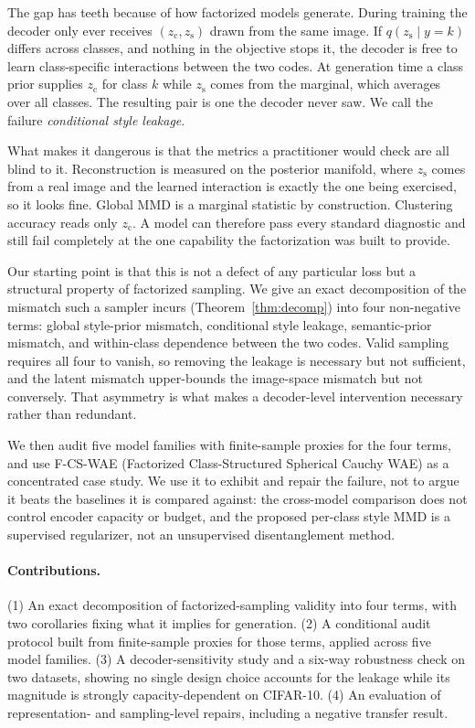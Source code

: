 \documentclass[letterpaper]{article} %
\newcommand{\ours}{F-CS-WAE}
\newcommand{\zc}{z_{\mathrm{c}}}
\newcommand{\zs}{z_{\mathrm{s}}}
\begin{document}
The gap has teeth because of how factorized models generate. During
training the decoder only ever receives $(\zc,\zs)$ drawn from the same
image. If $q(\zs\mid y{=}k)$ differs across classes, and nothing in the
objective stops it, the decoder is free to learn class-specific interactions
between the two codes. At generation time a class prior supplies $\zc$ for
class $k$ while $\zs$ comes from the marginal, which averages over all
classes. The resulting pair is one the decoder never saw. We call the
failure \emph{conditional style leakage}.

What makes it dangerous is that the metrics a practitioner would check are
all blind to it. Reconstruction is measured on the posterior manifold, where
$\zs$ comes from a real image and the learned interaction is exactly the one
being exercised, so it looks fine. Global MMD is a marginal statistic by
construction. Clustering accuracy reads only $\zc$. A model can therefore
pass every standard diagnostic and still fail completely at the one
capability the factorization was built to provide.

Our starting point is that this is not a defect of any particular loss but a
structural property of factorized sampling. We give an exact decomposition
of the mismatch such a sampler incurs (Theorem~\ref{thm:decomp}) into four
non-negative terms: global style-prior mismatch, conditional style leakage,
semantic-prior mismatch, and within-class dependence between the two codes.
Valid sampling requires all four to vanish, so removing the leakage is
necessary but not sufficient, and the latent mismatch upper-bounds the
image-space mismatch but not conversely. That asymmetry is what makes a
decoder-level intervention necessary rather than redundant.

We then audit five model families with finite-sample proxies for the four
terms, and use \ours{} (Factorized Class-Structured Spherical Cauchy WAE) as
a concentrated case study. We use it to exhibit and repair the failure, not
to argue it beats the baselines it is compared against: the cross-model
comparison does not control encoder capacity or budget, and the proposed
per-class style MMD is a supervised regularizer, not an unsupervised
disentanglement method.

\paragraph{Contributions.}
(1) An exact decomposition of factorized-sampling validity into four terms,
with two corollaries fixing what it implies for generation. (2) A
conditional audit protocol built from finite-sample proxies for those terms,
applied across five model families. (3) A decoder-sensitivity study and a
six-way robustness check on two datasets, showing no single design choice
accounts for the leakage while its magnitude is strongly capacity-dependent
on CIFAR-10. (4) An evaluation of representation- and sampling-level
repairs, including a negative transfer result.
\end{document}
